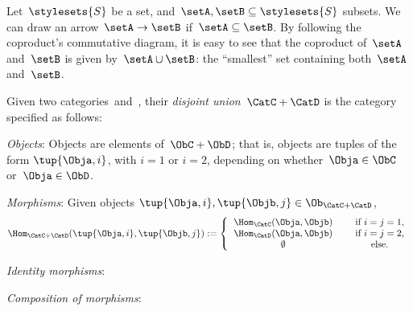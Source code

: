 \begin{example}
  \label{ex:subset_coprod}
  Let~$\stylesets{S}$ be a set, and~$\setA,\setB\subseteq \stylesets{S}$ subsets.
  We can draw an arrow~$\setA\to \setB$ if~$\setA\subseteq \setB$.
  By following the coproduct's commutative diagram, it is easy to see that the coproduct of~$\setA$ and~$\setB$ is given by~$\setA\cup\setB$: the ``smallest'' set containing both~$\setA$ and~$\setB$.
\end{example}


  \begin{ctdefinition}\label{def:disjoint-union-category}
    Given two categories~\CatC and~\CatD, their \emph{disjoint union}~$\CatC + \CatD$ is the category specified as follows:
    \begin{compactenum}
      \item \emph{Objects}: Objects are elements of~$\ObC + \ObD$; that is, objects are tuples of the form $\tup{\Obja, i}$, with $i=1$ or $i=2$, depending on whether~$\Obja \in \ObC$ or~$\Obja \in \ObD$.
      \item \emph{Morphisms}: Given objects $\tup{\Obja, i}, \tup{\Objb, j} \in \Ob_{\CatC + \CatD}$,
      \begin{equation}
	\Hom_{\CatC + \CatD} ( \tup{\Obja, i}, \tup{\Objb, j} ) :=
	\left\{
	\begin{tabular}{ccc}
	$\Hom_\CatC(\Obja, \Objb)$ & & if $i=j = 1$, \\
	$\Hom_\CatD(\Obja, \Objb)$ & & if $i = j =2$, \\
	$\emptyset$	& & else.
	\end{tabular}
	\right.
	\end{equation}

       \item \emph{Identity morphisms}:
      \item \emph{Composition of morphisms}:
          \end{compactenum}
  \end{ctdefinition}


